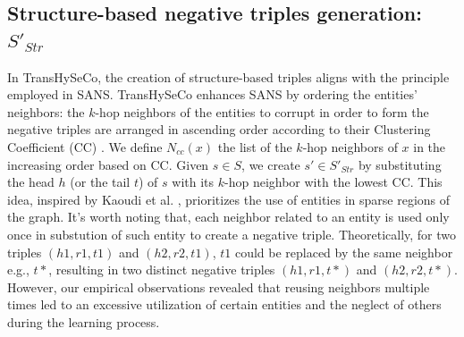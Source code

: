 \documentclass[sigconf]{acmart}
\newcommand{\TransHI}{TransHySeCo\xspace}
\begin{document}


\subsection{Structure-based negative triples generation: $S'_{Str}$}

In \TransHI, the creation of structure-based triples  aligns with the principle employed in SANS\cite{sanspaper}. \TransHI enhances SANS by ordering the entities' neighbors: the $k$-hop neighbors of the entities to corrupt in order to form the negative triples are arranged in ascending order according to their Clustering Coefficient  (CC) \cite{CC1988}. We define $N_{cc}(x)$ the list of the $k$-hop neighbors of  $x$ in  the increasing order based on CC. Given $s\in S$, we create $s' \in S'_{Str}$ by substituting the head $h$ (or the tail $t$)  of $s$ with its $k$-hop neighbor with the lowest CC. This idea, inspired by Kaoudi et al. \cite{volkr}, prioritizes the use of entities in sparse regions of the graph. It's worth noting that,  each neighbor related to an entity is used only once in substution of such entity to create a negative triple. Theoretically, for two triples $(h1, r1, t1)$ and $(h2, r2, t1)$, $t1$ could be replaced by the same neighbor e.g., $t*$, resulting in two distinct negative triples $(h1, r1, t*)$ and $(h2, r2, t*)$. However,  our empirical observations revealed that reusing neighbors multiple times led to an excessive utilization of certain entities and the neglect of others during the learning process. 
\end{document}
